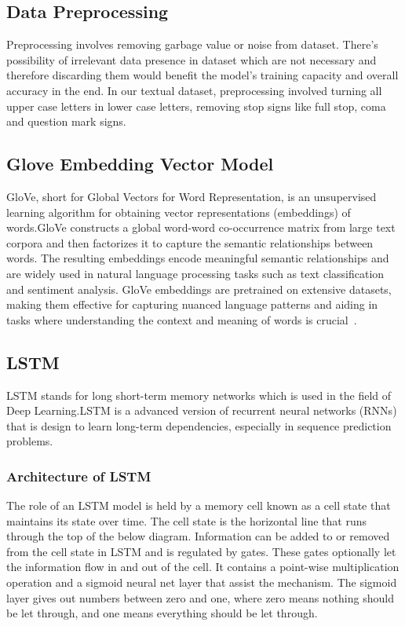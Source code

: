 \subsection{Data Preprocessing}
Preprocessing involves removing garbage value or noise from dataset. There's possibility of irrelevant data presence in dataset which are not necessary and therefore discarding them would benefit the model's training capacity and overall accuracy in the end. In our textual dataset, preprocessing involved turning all upper case letters in lower case letters, removing stop signs like full stop, coma and question mark signs.   

\subsection{Glove Embedding Vector Model}
GloVe, short for Global Vectors for Word Representation, is an unsupervised learning algorithm for obtaining vector representations (embeddings) of words.GloVe constructs a global word-word co-occurrence matrix from large text corpora and then factorizes it to capture the semantic relationships between words. The resulting embeddings encode meaningful semantic relationships and are widely used in natural language processing tasks such as text classification and sentiment analysis. GloVe embeddings are pretrained on extensive datasets, making them effective for capturing nuanced language patterns and aiding in tasks where understanding the context and meaning of words is crucial~\cite{ref10}.

\subsection{LSTM}
LSTM stands for long short-term memory networks which is used in the field of Deep Learning.LSTM is a advanced version of recurrent neural networks (RNNs) that is design to learn long-term dependencies, especially in sequence prediction problems.

\subsubsection{Architecture of LSTM}
The role of an LSTM model is held by a memory cell known as a cell state that maintains its state over time. The cell state is the horizontal line that runs through the top of the below diagram. Information can be added to or removed from the cell state in LSTM and is regulated by gates. These gates optionally let the information flow in and out of the cell. It contains a point-wise multiplication operation and a sigmoid neural net layer that assist the mechanism. The sigmoid layer gives out numbers between zero and one, where zero means nothing should be let through, and one means everything should be let through.~\cite{ref9}


